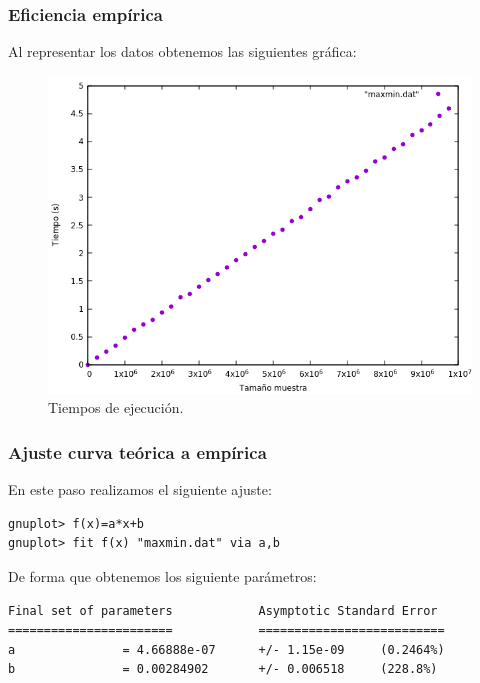 \subsubsection{Eficiencia empírica}

Al representar los datos obtenemos las siguientes gráfica:

\begin{figure}[H]
    \begin{center}
        \includegraphics[scale=0.7]{imagenes/g_mm.png}
        \caption{Tiempos de ejecución.}
        \label{fig2}
    \end{center}
\end{figure}

\subsubsection{Ajuste curva teórica a empírica}

En este paso realizamos el siguiente ajuste:
\begin{shaded*}
\begin{verbatim}
gnuplot> f(x)=a*x+b
gnuplot> fit f(x) "maxmin.dat" via a,b

\end{verbatim}
\end{shaded*}

De forma que obtenemos los siguiente parámetros:

\begin{shaded*}
\begin{verbatim}
Final set of parameters            Asymptotic Standard Error
=======================            ==========================
a               = 4.66888e-07      +/- 1.15e-09     (0.2464%)
b               = 0.00284902       +/- 0.006518     (228.8%)

\end{verbatim}
\end{shaded*}


